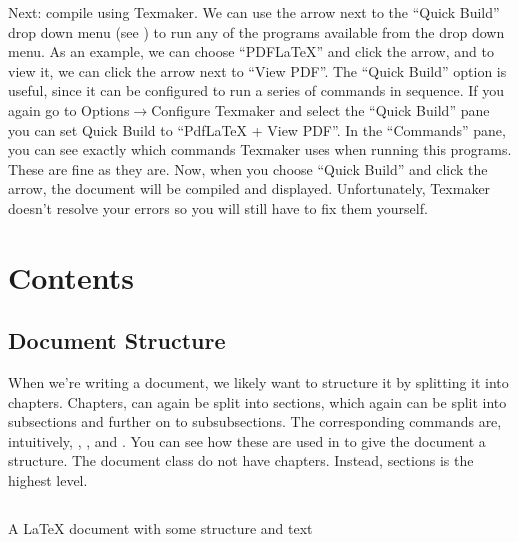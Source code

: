 Next: compile using Texmaker. We can use the arrow next to the ``Quick Build'' drop down menu (see ) to run any of the programs available from the drop down menu. As an example, we can choose ``PDFLaTeX'' and click the arrow, and to view it, we can click the arrow next to ``View PDF''. The ``Quick Build'' option is useful, since it can be configured to run a series of commands in sequence. If you again go to Options$\rightarrow$Configure Texmaker and select the ``Quick Build'' pane you can set Quick Build to ``PdfLaTeX + View PDF''. In the ``Commands'' pane, you can see exactly which commands Texmaker uses when running this programs. These are fine as they are. Now, when you choose ``Quick Build'' and click the arrow, the document will be compiled and displayed. Unfortunately, Texmaker doesn't resolve your errors so you will still have to fix them yourself.

\section{Contents}
\subsection{Document Structure}
When we're writing a document, we likely want to structure it by splitting it into chapters. Chapters, can again be split into sections, which again can be split into subsections and further on to subsubsections. The corresponding commands are, intuitively, \latexin{\chapter}, \latexin{\section}, \latexin{\subsection} and \latexin{\subsubsection}. You can see how these are used in  to give the document a structure. The  document class do not have chapters. Instead, sections is the highest level.

\begin{listing}
	\inputminted{latex}{latex/structure.tex}
	\caption{A \LaTeX{} document with some structure and text}
	\label{lst:latex:structure}
\end{listing}

